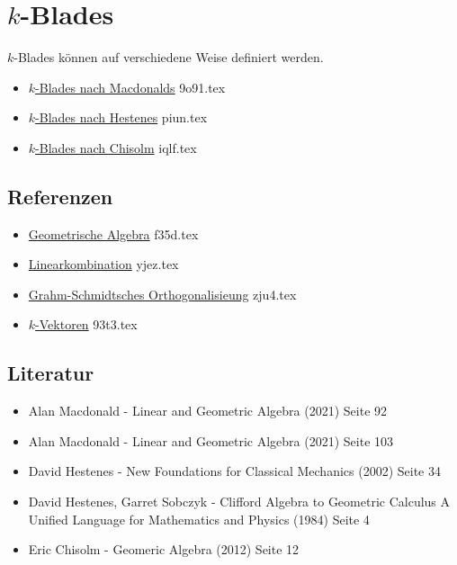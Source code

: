 \documentclass{sajzk}
\begin{document}
\section{\texorpdfstring{$k$-Blades}{k-Blades}}
\label{kikd}
$k$-Blades können auf verschiedene Weise definiert werden.

\begin{itemize}
    \item \href{9o91.pdf}{$k$-Blades nach Macdonalds} 9o91.tex
    \item \href{piun.pdf}{$k$-Blades nach Hestenes} piun.tex
    \item \href{iqlf.pdf}{$k$-Blades nach Chisolm} iqlf.tex
\end{itemize}

\subsection{Referenzen}
\begin{itemize}
    \item \href{f35d.pdf}{Geometrische Algebra} f35d.tex
    \item \href{yjez.pdf}{Linearkombination} yjez.tex
    \item \href{zju4.pdf}{Grahm-Schmidtsches Orthogonalisieung} zju4.tex
    \item \href{93t3.pdf}{$k$-Vektoren} 93t3.tex
\end{itemize}

\subsection{Literatur}
\begin{itemize}
    \item Alan Macdonald - Linear and Geometric Algebra (2021) Seite 92
    \item Alan Macdonald - Linear and Geometric Algebra (2021) Seite 103
    \item David Hestenes - New Foundations for Classical Mechanics (2002) Seite 34
    \item David Hestenes, Garret Sobczyk - Clifford Algebra to Geometric Calculus A
          Unified Language for Mathematics and Physics (1984) Seite 4
    \item Eric Chisolm - Geomeric Algebra (2012) Seite 12
\end{itemize}
\end{document}
